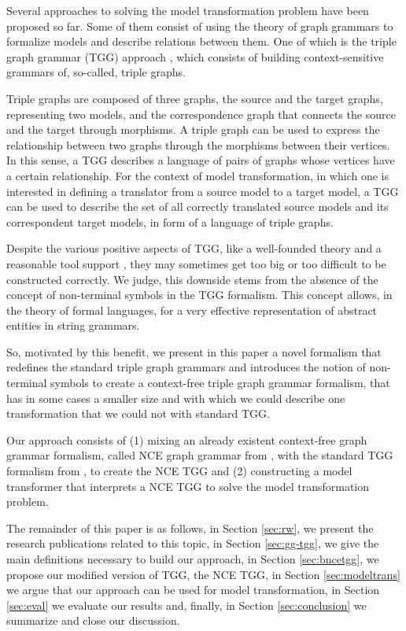 \documentclass[runningheads]{llncs}
\begin{document}
Several approaches to solving the model transformation problem have been proposed so far. Some of them consist of using the theory of graph grammars to formalize models and describe relations between them. One of which is the triple graph grammar (TGG) approach \cite{schurr1994specification}, which consists of building context-sensitive grammars of, so-called, triple graphs.

Triple graphs are composed of three graphs, the source and the target graphs, representing two models, and the correspondence graph that connects the source and the target through morphisms. A triple graph can be used to express the relationship between two graphs through the morphisms between their vertices. In this sense, a TGG describes a language of pairs of graphs whose vertices have a certain relationship. For the context of model transformation, in which one is interested in defining a translator from a source model to a target model, a TGG can be used to describe the set of all correctly translated source models and its correspondent target models, in form of a language of triple graphs.

Despite the various positive aspects of TGG, like a well-founded theory and a reasonable tool support \cite{anjorin201620}, they may sometimes get too big or too difficult to be constructed correctly. We judge, this downside stems from the absence of the concept of non-terminal symbols in the TGG formalism. This concept allows, in the theory of formal languages, for a very effective representation of abstract entities in string grammars.

So, motivated by this benefit, we present in this paper a novel formalism that redefines the standard triple graph grammars and introduces the notion of non-terminal symbols to create a context-free triple graph grammar formalism, that has in some cases a smaller size and with which we could describe one transformation that we could not with standard TGG.

Our approach consists of (1) mixing an already existent context-free graph grammar formalism, called NCE graph grammar from \cite{janssens1982graph}, with the standard TGG formalism from \cite{schurr1994specification}, to create the NCE TGG and (2) constructing a model transformer that interprets a NCE TGG to solve the model transformation problem.

The remainder of this paper is as follows, in Section \ref{sec:rw}, we present the research publications related to this topic, in Section \ref{sec:gg-tgg}, we give the main definitions necessary to build our approach, in Section \ref{sec:bncetgg}, we propose our modified version of TGG, the NCE TGG, in Section \ref{sec:modeltrans} we argue that our approach can be used for model transformation, in Section \ref{sec:eval} we evaluate our results and, finally, in Section \ref{sec:conclusion} we summarize and close our discussion.
\end{document}
